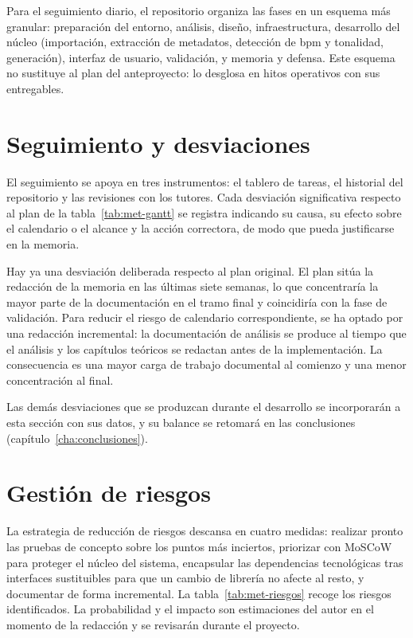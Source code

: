 Para el seguimiento diario, el repositorio organiza las fases en un esquema más granular: preparación del entorno, análisis, diseño, infraestructura, desarrollo del núcleo (importación, extracción de metadatos, detección de \acs{bpm} y tonalidad, generación), interfaz de usuario, validación, y memoria y defensa. Este esquema no sustituye al plan del anteproyecto: lo desglosa en hitos operativos con sus entregables.

\section{Seguimiento y desviaciones}
\label{sec:met-desviaciones}

El seguimiento se apoya en tres instrumentos: el tablero de tareas, el historial del repositorio y las revisiones con los tutores. Cada desviación significativa respecto al plan de la tabla~\ref{tab:met-gantt} se registra indicando su causa, su efecto sobre el calendario o el alcance y la acción correctora, de modo que pueda justificarse en la memoria.

Hay ya una desviación deliberada respecto al plan original. El plan sitúa la redacción de la memoria en las últimas siete semanas, lo que concentraría la mayor parte de la documentación en el tramo final y coincidiría con la fase de validación. Para reducir el riesgo de calendario correspondiente, se ha optado por una redacción incremental: la documentación de análisis se produce al tiempo que el análisis y los capítulos teóricos se redactan antes de la implementación. La consecuencia es una mayor carga de trabajo documental al comienzo y una menor concentración al final.

Las demás desviaciones que se produzcan durante el desarrollo se incorporarán a esta sección con sus datos, y su balance se retomará en las conclusiones (capítulo~\ref{cha:conclusiones}).

\section{Gestión de riesgos}
\label{sec:met-riesgos}

La estrategia de reducción de riesgos descansa en cuatro medidas: realizar pronto las pruebas de concepto sobre los puntos más inciertos, priorizar con MoSCoW para proteger el núcleo del sistema, encapsular las dependencias tecnológicas tras interfaces sustituibles para que un cambio de librería no afecte al resto, y documentar de forma incremental. La tabla~\ref{tab:met-riesgos} recoge los riesgos identificados. La probabilidad y el impacto son estimaciones del autor en el momento de la redacción y se revisarán durante el proyecto.

